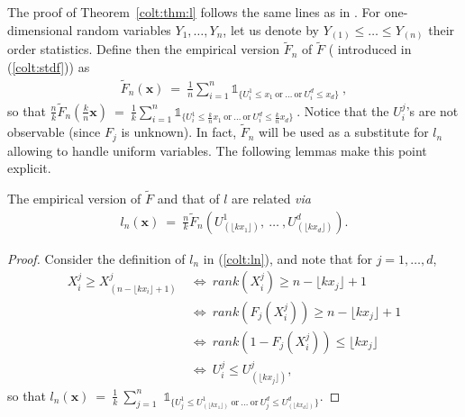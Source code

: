 The proof of Theorem~\ref{colt:thm:l} follows the same lines as in \cite{Qi97}.
For one-dimensional random variables $Y_1,\ldots,Y_n$, let us denote
by $Y_{(1)} \le \ldots\le Y_{(n)}$ their order statistics. Define 
then the empirical version $\tilde F_n$ of $\tilde F$ ( introduced in
(\ref{colt:stdf})) as 
\begin{align*}
 \tilde F_n(\mathbf{x})  ~=~ \frac{1}{n} \sum_{i=1}^n \mathds{1}_{\{ U_i^1 \le x_1 ~\text{or}~\ldots~\text{or}~ U_i^d \le x_d \}}~ ,%
\end{align*}
so that 
$%
  \frac{n}{k} \tilde F_n(\frac{k}{n}\mathbf{x}) ~=~ \frac{1}{k}
  \sum_{i=1}^n \mathds{1}_{\{ U_i^1 \le \frac{k}{n}x_1 ~\text{or}~\ldots~\text{or}~
    U_i^d \le \frac{k}{n}x_d
    \}}~
$. %
\noindent Notice that the $U_i^j$'s are  not observable (since $F_j$ is
unknown). In fact, $\tilde F_n$ will be used as a substitute for $l_n$
 allowing to handle uniform variables. The 
 following lemmas make this point explicit. %

\begin{lemma}
\label{colt:ln-Fn}
The  empirical version of $\tilde F$ and that of $l$ are related \emph{via}
\begin{align*}
l_n(\mathbf{x})~=~\frac{n}{k} \tilde F_n(U_{(\lfloor kx_1\rfloor)}^1,~\ldots~, U_{(\lfloor kx_d \rfloor)}^d).
\end{align*}
\end{lemma}

\begin{proof}
Consider the definition of $l_n$ in (\ref{colt:ln}), and note that for $j=1,\ldots,d$, 
\begin{align*}
 X_i^j \ge X_{(n-\lfloor  kx_i \rfloor +1)}^j &~\Leftrightarrow~ rank(X_i^j) \ge n-\lfloor  kx_j \rfloor+1 \\ &~\Leftrightarrow~  rank( F_j(X_i^j)) \ge n-\lfloor kx_j\rfloor+1 \\ &~\Leftrightarrow~  rank(1-F_j(X_i^j)) \le \lfloor kx_j\rfloor\\ &~\Leftrightarrow~  U_i^j \le U_{(\lfloor kx_j\rfloor)}^j,
\end{align*}
 so that 
$l_n(\mathbf{x})~=~\frac{1}{k}~\sum_{j=1}^n$ $\mathds{1}_{\{ U_j^1 \le U_{(\lfloor kx_1\rfloor)}^1 ~\text{or}~\ldots~\text{or}~ U_j^d \le U_{(\lfloor kx_d\rfloor)}^d  \}}$.
\end{proof}
~\\


